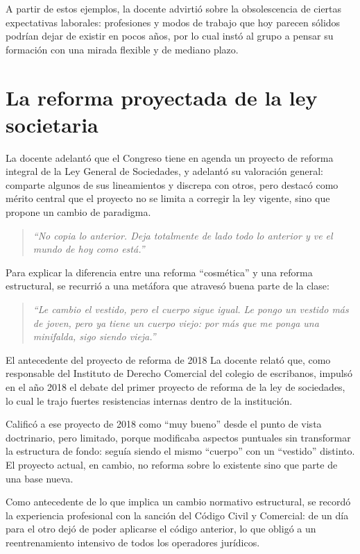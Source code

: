\documentclass[12pt,oneside]{book}
\begin{document}
A partir de estos ejemplos, la docente advirtió sobre la obsolescencia de ciertas expectativas laborales: profesiones y modos de trabajo que hoy parecen sólidos podrían dejar de existir en pocos años, por lo cual instó al grupo a pensar su formación con una mirada flexible y de mediano plazo.

\section{La reforma proyectada de la ley societaria}

La docente adelantó que el Congreso tiene en agenda un proyecto de reforma integral de la Ley General de Sociedades, y adelantó su valoración general: comparte algunos de sus lineamientos y discrepa con otros, pero destacó como mérito central que el proyecto no se limita a corregir la ley vigente, sino que propone un cambio de paradigma.

\begin{quote}
\textit{``No copia lo anterior. Deja totalmente de lado todo lo anterior y ve el mundo de hoy como está.''}
\end{quote}

Para explicar la diferencia entre una reforma ``cosmética'' y una reforma estructural, se recurrió a una metáfora que atravesó buena parte de la clase:

\begin{quote}
\textit{``Le cambio el vestido, pero el cuerpo sigue igual. Le pongo un vestido más de joven, pero ya tiene un cuerpo viejo: por más que me ponga una minifalda, sigo siendo vieja.''}
\end{quote}

\begin{example}{El antecedente del proyecto de reforma de 2018}
La docente relató que, como responsable del Instituto de Derecho Comercial del colegio de escribanos, impulsó en el año 2018 el debate del primer proyecto de reforma de la ley de sociedades, lo cual le trajo fuertes resistencias internas dentro de la institución.

Calificó a ese proyecto de 2018 como ``muy bueno'' desde el punto de vista doctrinario, pero limitado, porque modificaba aspectos puntuales sin transformar la estructura de fondo: seguía siendo el mismo ``cuerpo'' con un ``vestido'' distinto. El proyecto actual, en cambio, no reforma sobre lo existente sino que parte de una base nueva.
\end{example}

Como antecedente de lo que implica un cambio normativo estructural, se recordó la experiencia profesional con la sanción del Código Civil y Comercial: de un día para el otro dejó de poder aplicarse el código anterior, lo que obligó a un reentrenamiento intensivo de todos los operadores jurídicos.
\end{document}
